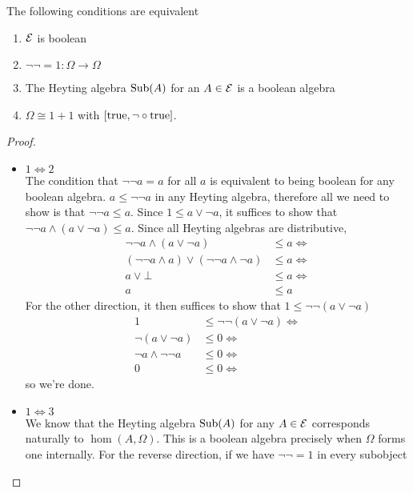 \begin{lem}\label{lem:background:boolean}
  The following conditions are equivalent
  \begin{enumerate}
  \item $\mathcal{E}$ is boolean
  \item $\neg\neg = 1 : \Omega \to \Omega$
  \item The Heyting algebra $\operatorname{Sub}(A)$ for an $A \in \mathcal{E}$ is a
    boolean algebra
  \item $\Omega \cong 1 + 1$ with $[\operatorname{true}, \neg \circ \operatorname{true}]$.
  \end{enumerate}
\end{lem}
\begin{proof}\hfill
  \begin{itemize}
  \item $1 \iff 2$\\
    The condition that $\neg\neg a = a$ for all $a$ is equivalent to
    being boolean for any boolean algebra. $a \le \neg \neg a$ in any
    Heyting algebra, therefore all we need to show is that
    $\neg \neg a \le a$. Since $1 \le a \vee \neg a$, it suffices to
    show that $\neg \neg a \wedge (a \vee \neg a) \le a$. Since all
    Heyting algebras are distributive,
    \begin{align*}
      \neg \neg a \wedge (a \vee \neg a) &\le a \Leftrightarrow \\
      (\neg \neg a \wedge a) \vee (\neg \neg a \wedge \neg a) &\le a \Leftrightarrow \\
      a \vee \bot &\le a \Leftrightarrow \\
      a &\le a
    \end{align*}
    For the other direction, it then suffices to show that
    $1 \le \neg \neg (a \vee \neg a)$
    \begin{align*}
      1 &\le \neg \neg (a \vee \neg a) \Leftrightarrow\\
      \neg (a \vee \neg a) &\le 0 \Leftrightarrow\\
      \neg a \wedge \neg \neg a &\le 0 \Leftrightarrow\\
      0 &\le 0 \Leftrightarrow
    \end{align*}
    so we're done.
  \item $1 \iff 3$\\
    We know that the Heyting algebra $\operatorname{Sub}(A)$ for any $A \in \mathcal{E}$
    corresponds naturally to $\hom(A, \Omega)$. This is a boolean
    algebra precisely when $\Omega$ forms one internally. For the
    reverse direction, if we have $\neg\neg = 1$ in every subobject

\end{itemize}
\end{proof}
